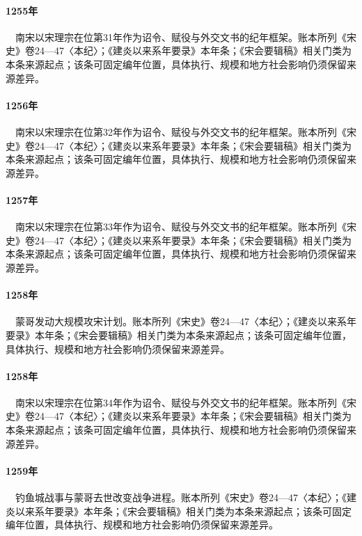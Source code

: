 \paragraph{1255年}　南宋以宋理宗在位第31年作为诏令、赋役与外交文书的纪年框架。账本所列《宋史》卷24—47〈本纪〉；《建炎以来系年要录》本年条；《宋会要辑稿》相关门类为本条来源起点；该条可固定编年位置，具体执行、规模和地方社会影响仍须保留来源差异。

\paragraph{1256年}　南宋以宋理宗在位第32年作为诏令、赋役与外交文书的纪年框架。账本所列《宋史》卷24—47〈本纪〉；《建炎以来系年要录》本年条；《宋会要辑稿》相关门类为本条来源起点；该条可固定编年位置，具体执行、规模和地方社会影响仍须保留来源差异。

\paragraph{1257年}　南宋以宋理宗在位第33年作为诏令、赋役与外交文书的纪年框架。账本所列《宋史》卷24—47〈本纪〉；《建炎以来系年要录》本年条；《宋会要辑稿》相关门类为本条来源起点；该条可固定编年位置，具体执行、规模和地方社会影响仍须保留来源差异。

\paragraph{1258年}　蒙哥发动大规模攻宋计划。账本所列《宋史》卷24—47〈本纪〉；《建炎以来系年要录》本年条；《宋会要辑稿》相关门类为本条来源起点；该条可固定编年位置，具体执行、规模和地方社会影响仍须保留来源差异。

\paragraph{1258年}　南宋以宋理宗在位第34年作为诏令、赋役与外交文书的纪年框架。账本所列《宋史》卷24—47〈本纪〉；《建炎以来系年要录》本年条；《宋会要辑稿》相关门类为本条来源起点；该条可固定编年位置，具体执行、规模和地方社会影响仍须保留来源差异。

\paragraph{1259年}　钓鱼城战事与蒙哥去世改变战争进程。账本所列《宋史》卷24—47〈本纪〉；《建炎以来系年要录》本年条；《宋会要辑稿》相关门类为本条来源起点；该条可固定编年位置，具体执行、规模和地方社会影响仍须保留来源差异。

